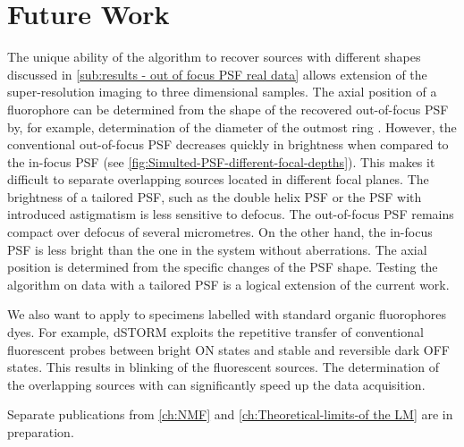 
\section{Future Work}

The unique ability of the \inmf{} algorithm to recover sources with different shapes discussed in \autoref{sub:results - out of focus PSF real data} allows extension of the super-resolution imaging to three dimensional samples. The axial position of a fluorophore can be determined from the shape of the recovered out-of-focus PSF by, for example, determination of the diameter of the outmost ring \cite{Speidel2003}. However, the conventional out-of-focus PSF decreases quickly in brightness when compared to the in-focus PSF (see \autoref{fig:Simulted-PSF-different-focal-depths}). This makes it difficult to separate overlapping sources located in different focal planes. The brightness of a tailored PSF, such as the double helix PSF \cite{Quirin2011} or the PSF with introduced astigmatism \cite{Huang2008} is less sensitive to defocus. The out-of-focus PSF remains compact over defocus of several micrometres. On the other hand, the in-focus PSF is less bright than the one in the system without aberrations. The axial position is determined from the specific changes of the PSF shape. Testing the \inmf{} algorithm on data with a tailored PSF is a logical extension of the current work. 

We also want to apply \inmf{} to specimens labelled with standard organic fluorophores dyes. For example, dSTORM \cite{VandeLinde2011} exploits the repetitive transfer of conventional fluorescent probes between bright ON states  and stable and reversible dark OFF states. This results in blinking of the fluorescent sources. The determination of the overlapping sources with \inmf{} can significantly speed up the data acquisition.

Separate publications from \autoref{ch:NMF} and \autoref{ch:Theoretical-limits-of the LM} are in preparation.